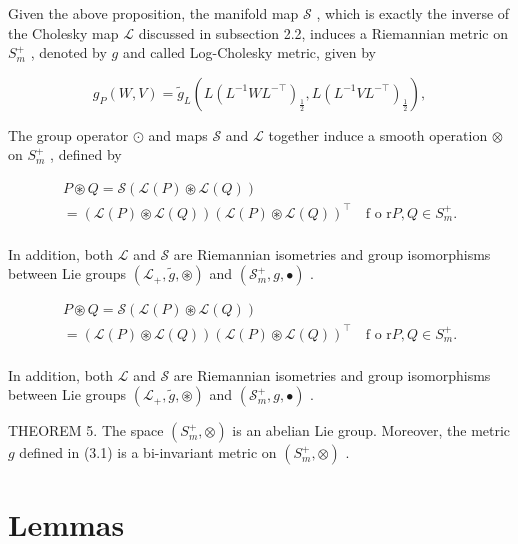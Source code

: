 \documentclass[11pt]{article}
\begin{document}
Given the above proposition, the manifold map  $\mathcal{S}$ , which is exactly the inverse of the Cholesky map  $\mathcal{L}$  discussed in subsection 2.2, induces a Riemannian metric on  $S_{m}^{+}$ , denoted by  $g$  and called Log-Cholesky metric, given by

$$
g _ {P} (W, V) = \tilde {g} _ {L} \left(L \left(L ^ {- 1} W L ^ {- \top}\right) _ {\frac {1}{2}}, L \left(L ^ {- 1} V L ^ {- \top}\right) _ {\frac {1}{2}}\right), \tag {3.1}
$$

The group operator  $\odot$  and maps  $\mathcal{S}$  and  $\mathcal{L}$  together induce a smooth operation  $\otimes$  on  $S_{m}^{+}$ , defined by

$$
\begin{array}{l} P \circledast Q = \mathcal {S} (\mathcal {L} (P) \circledast \mathcal {L} (Q)) \\ = \left(\mathcal {L} (P) \circledast \mathcal {L} (Q)\right) \left(\mathcal {L} (P) \circledast \mathcal {L} (Q)\right) ^ {\top} \quad \text {f o r} P, Q \in S _ {m} ^ {+}. \\ \end{array}
$$

In addition, both  $\mathcal{L}$  and  $\mathcal{S}$  are Riemannian isometries and group isomorphisms between Lie groups  $(\mathcal{L}_{+},\tilde{g},\circledast)$  and  $(\mathcal{S}_m^+,g,\bullet)$ .

$$
\begin{array}{l} P \circledast Q = \mathcal {S} (\mathcal {L} (P) \circledast \mathcal {L} (Q)) \\ = \left(\mathcal {L} (P) \circledast \mathcal {L} (Q)\right) \left(\mathcal {L} (P) \circledast \mathcal {L} (Q)\right) ^ {\top} \quad \text {f o r} P, Q \in S _ {m} ^ {+}. \\ \end{array}
$$

In addition, both  $\mathcal{L}$  and  $\mathcal{S}$  are Riemannian isometries and group isomorphisms between Lie groups  $(\mathcal{L}_{+},\tilde{g},\circledast)$  and  $(\mathcal{S}_m^+,g,\bullet)$ .

THEOREM 5. The space  $(S_m^+, \otimes)$  is an abelian Lie group. Moreover, the metric  $g$  defined in (3.1) is a bi-invariant metric on  $(S_m^+, \otimes)$ .


\section*{Lemmas}
\end{document}
